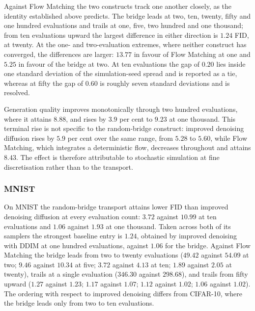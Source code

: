 Against Flow Matching the two constructs track one another closely, as the
identity established above predicts. The bridge leads at two, ten, twenty, fifty
and one hundred evaluations and trails at one, five, two hundred and one
thousand; from ten evaluations upward the largest difference in either
direction is $1.24$ FID, at twenty. At the one- and two-evaluation extremes,
where neither construct has converged, the differences are larger: $13.77$ in
favour of Flow Matching at one and $5.25$ in favour of the bridge at two.
At ten evaluations the gap of $0.20$ lies inside one standard
deviation of the simulation-seed spread and is reported as a tie, whereas at
fifty the gap of $0.60$ is roughly seven standard deviations and is resolved.

Generation quality improves monotonically through two hundred evaluations,
where it attains $8.88$, and rises by $3.9$ per cent to $9.23$ at one thousand.
This terminal rise is not specific to the random-bridge construct: improved
denoising diffusion rises by $5.9$ per cent over the same range, from $5.28$ to
$5.60$, while Flow Matching, which integrates a deterministic flow, decreases
throughout and attains $8.43$. The effect is therefore attributable to
stochastic simulation at fine discretisation rather than to the transport.

\subsubsection*{MNIST}

\begin{table}[htbp]
\begin{center}
\caption{MNIST. FID against the training split, $50\,000$ generated samples per
entry; the measured floor is $0.98$ at $n=10\,000$ and does not admit a
defensible extrapolation to $50\,000$. Mean $\pm$ standard deviation over
simulation seeds where repeats were run.}
\label{tab:mnist}
\vskip 0.1in
\resizebox{\textwidth}{!}{}
\end{center}
\end{table}

On MNIST the random-bridge transport attains lower FID than improved denoising
diffusion at every evaluation count: $3.72$ against $10.99$ at ten evaluations
and $1.06$ against $1.93$ at one thousand. Taken across both of its samplers the
strongest baseline entry is $1.24$, obtained by improved denoising with DDIM at
one hundred evaluations, against $1.06$ for the bridge. Against Flow Matching the
bridge leads from two to twenty evaluations ($49.42$ against $54.09$ at two;
$9.46$ against $10.34$ at five; $3.72$ against $4.13$ at ten; $1.89$ against
$2.05$ at twenty), trails at a single evaluation ($346.30$ against $298.68$),
and trails from fifty upward ($1.27$ against $1.23$; $1.17$ against
$1.07$; $1.12$ against $1.02$; $1.06$ against $1.02$). The ordering with respect
to improved denoising differs from CIFAR-10, where the bridge leads only from
two to ten evaluations.

